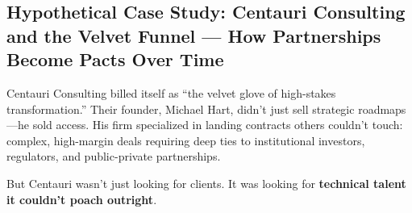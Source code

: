 \subsection{Hypothetical Case Study: Centauri Consulting and the Velvet Funnel — How Partnerships Become Pacts Over Time}

Centauri Consulting billed itself as “the velvet glove of high-stakes transformation.” Their founder, Michael Hart, didn’t just sell strategic roadmaps—he sold access. His firm specialized in landing contracts others couldn’t touch: complex, high-margin deals requiring deep ties to institutional investors, regulators, and public-private partnerships.

But Centauri wasn’t just looking for clients. It was looking for \textbf{technical talent it couldn’t poach outright}.

\medskip

